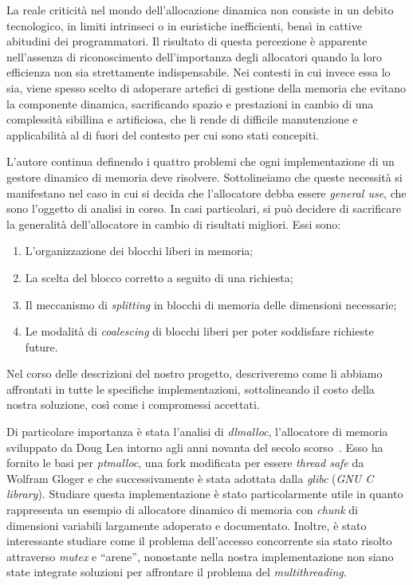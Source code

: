 La reale criticità nel mondo dell’allocazione dinamica non consiste in un debito tecnologico, in limiti intrinseci o in euristiche inefficienti, bensì in cattive abitudini dei programmatori. Il risultato di questa percezione è apparente nell’assenza di riconoscimento dell’importanza degli allocatori quando la loro efficienza non sia strettamente indispensabile. Nei contesti in cui invece essa lo sia, viene spesso scelto di adoperare artefici di gestione della memoria che evitano la componente dinamica, sacrificando spazio e prestazioni in cambio di una complessità sibillina e artificiosa, che li rende di difficile manutenzione e applicabilità al di fuori del contesto per cui sono stati concepiti.

L’autore continua definendo i quattro problemi che ogni implementazione di un gestore dinamico di memoria deve risolvere. Sottolineiamo che queste necessità si manifestano nel caso in cui si decida che l’allocatore debba essere \textit{general use}, che sono l’oggetto di analisi in corso. In casi particolari, si può decidere di sacrificare la generalità dell’allocatore in cambio di risultati migliori. Essi sono:
\begin{enumerate}
  \item L’organizzazione dei blocchi liberi in memoria;
  \item La scelta del blocco corretto a seguito di una richiesta;
  \item Il meccanismo di \textit{splitting} in blocchi di memoria delle dimensioni necessarie;
  \item Le modalità di \textit{coalescing} di blocchi liberi per poter soddisfare richieste future.
\end{enumerate}
Nel corso delle descrizioni del nostro progetto, descriveremo come li abbiamo affrontati in tutte le specifiche implementazioni, sottolineando il costo della nostra soluzione, così come i compromessi accettati.

Di particolare importanza è stata l’analisi di \textit{dlmalloc}, l’allocatore di memoria sviluppato da Doug Lea intorno agli anni novanta del secolo scorso~\cite{dlmalloc}. Esso ha fornito le basi per \textit{ptmalloc}, una fork modificata per essere \textit{thread safe} da Wolfram Gloger e che successivamente è stata adottata dalla \textit{glibc} (\textit{GNU C library}). Studiare questa implementazione è stato particolarmente utile in quanto rappresenta un esempio di allocatore dinamico di memoria con \textit{chunk} di dimensioni variabili largamente adoperato e documentato. Inoltre, è stato interessante studiare come il problema dell’accesso concorrente sia stato risolto attraverso \textit{mutex} e ``arene'', nonostante nella nostra implementazione non siano state integrate soluzioni per affrontare il problema del \textit{multithreading}.


